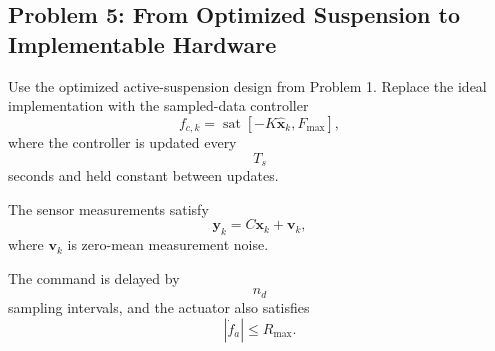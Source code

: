 \subsection*{Problem 5: From Optimized Suspension to Implementable Hardware}

Use the optimized active-suspension design from Problem 1. Replace the ideal
implementation with the sampled-data controller
\begin{equation}
f_{c,k}
=
\operatorname{sat}
\left[
-K\widehat{\mathbf{x}}_k,
F_{\max}
\right],
\end{equation}
where the controller is updated every
\begin{equation}
T_s
\end{equation}
seconds and held constant between updates.

The sensor measurements satisfy
\begin{equation}
\mathbf{y}_k
=
C\mathbf{x}_k
+
\mathbf{v}_k,
\end{equation}
where $\mathbf{v}_k$ is zero-mean measurement noise.

The command is delayed by
\begin{equation}
n_d
\end{equation}
sampling intervals, and the actuator also satisfies
\begin{equation}
|\dot{f}_a|
\leq
R_{\max}.
\end{equation}

